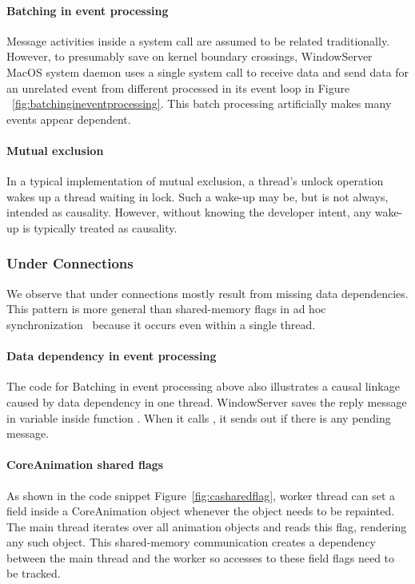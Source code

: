 \paragraph{Batching in event processing}

Message activities inside a system call are assumed to be related traditionally.
However, to presumably save on kernel boundary crossings, WindowServer MacOS
system daemon uses a single system call to receive data and send data for
an unrelated event from different processed in its event loop in Figure
~\ref{fig:batchingineventprocessing}. This batch processing artificially makes
many events appear dependent.

\paragraph{Mutual exclusion}

In a typical implementation of mutual exclusion, a thread's unlock operation
wakes up a thread waiting in lock. Such a wake-up may be, but is not always,
intended as causality. However, without knowing the developer intent, any
wake-up is typically treated as causality. 

\subsubsection{Under Connections}\label{subsec:underconnections}

We observe that under connections mostly result from missing data
dependencies.  This pattern is more general than shared-memory flags in ad
hoc synchronization~\cite{xiong2010ad} because it occurs even within a
single thread. 

\paragraph{Data dependency in event processing}
The code for Batching in event processing above also illustrates a causal
linkage caused by data dependency in one thread. WindowServer saves the reply
message in variable  inside function .
When it calls , it sends out  if there is
any pending message.

\paragraph{CoreAnimation shared flags}
As shown in the code snippet Figure~\ref{fig:casharedflag}, worker thread can set a
field  inside a CoreAnimation object whenever the object needs
to be repainted. The main thread iterates over all animation objects and reads
this flag, rendering any such object. This shared-memory communication creates
a dependency between the main thread and the worker so accesses to these field
flags need to be tracked.

